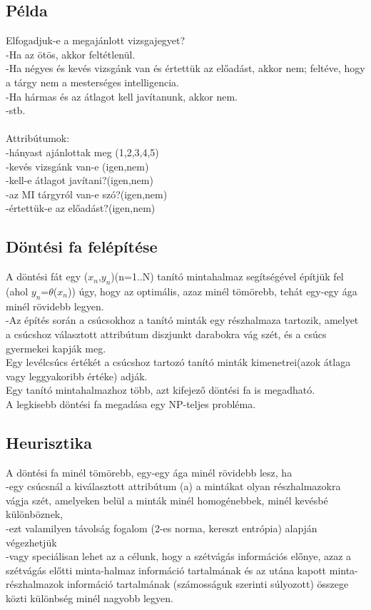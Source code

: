 \documentclass{article}
\begin{document}
	 \subsection{Példa}
	 Elfogadjuk-e a megajánlott vizsgajegyet?\\
	 -Ha az ötös, akkor feltétlenül.\\
	 -Ha négyes és kevés vizsgánk van és értettük az előadást, akkor nem; feltéve, hogy a tárgy nem a mesterséges intelligencia.\\
	 -Ha hármas és az átlagot kell javítanunk, akkor nem.\\
	 -stb.\\ \\
	 Attribútumok:\\
	 -hányast ajánlottak meg (1,2,3,4,5)\\
	 -kevés vizsgánk van-e (igen,nem)\\
	 -kell-e átlagot javítani?(igen,nem)\\
	 -az MI tárgyról van-e szó?(igen,nem)\\
	 -értettük-e az előadást?(igen,nem)\\
	 
	 \subsection{Döntési fa felépítése}
	 A döntési fát egy ($x_n$,$y_n$)(n=1..N) tanító mintahalmaz segítségével építjük fel (ahol $y_n$=$\theta$($x_n$)) úgy, hogy az optimális, azaz minél tömörebb, tehát egy-egy ága minél rövidebb legyen.\\
	 -Az építés során a csúcsokhoz a tanító minták egy részhalmaza tartozik, amelyet a csúcshoz választott attribútum diszjunkt darabokra vág szét, és a csúcs gyermekei kapják meg.\\
	 Egy levélcsúcs értékét a csúcshoz tartozó tanító minták kimenetrei(azok átlaga vagy leggyakoribb értéke) adják.\\
	 Egy tanító mintahalmazhoz több, azt kifejező döntési fa is megadható.\\
	 A legkisebb döntési fa megadása egy NP-teljes probléma.
	 
	 \subsection{Heurisztika}
	 A döntési fa minél tömörebb, egy-egy ága minél rövidebb lesz, ha\\
	 -egy csúcsnál a kiválasztott attribútum (a) a mintákat olyan részhalmazokra vágja szét, amelyeken belül a minták minél homogénebbek, minél kevésbé különböznek,\\
	 -ezt valamilyen távolság fogalom (2-es norma, kereszt entrópia) alapján végezhetjük\\
	 -vagy speciálisan lehet az a célunk, hogy a szétvágás információs előnye, azaz a szétvágás előtti minta-halmaz információ tartalmának és az utána kapott minta-részhalmazok információ tartalmának (számosságuk szerinti súlyozott) összege közti különbség minél nagyobb legyen.\\
	 
\end{document}
